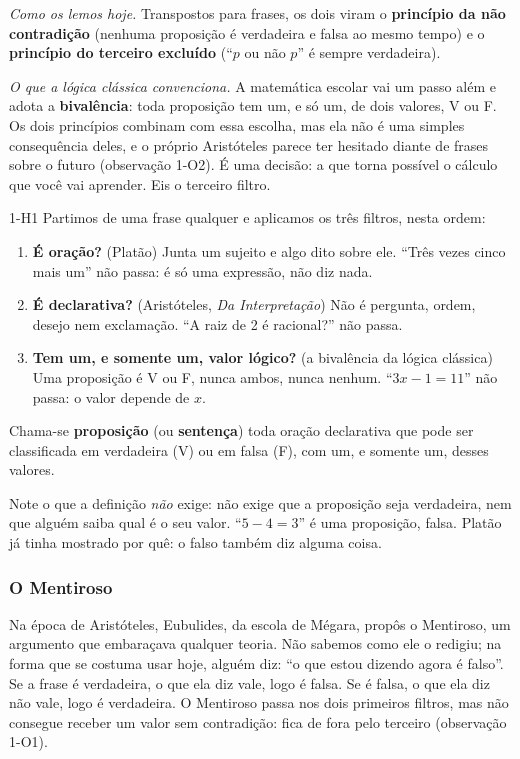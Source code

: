 \emph{Como os lemos hoje.} Transpostos para frases, os dois viram o \textbf{princípio da não contradição} (nenhuma proposição é verdadeira e falsa ao mesmo tempo) e o \textbf{princípio do terceiro excluído} (\enquote{$p$ ou não $p$} é sempre verdadeira).

\emph{O que a lógica clássica convenciona.} A matemática escolar vai um passo além e adota a \textbf{bivalência}: toda proposição tem um, e só um, de dois valores, V ou F. Os dois princípios combinam com essa escolha, mas ela não é uma simples consequência deles, e o próprio Aristóteles parece ter hesitado diante de frases sobre o futuro (observação 1-O2). É uma decisão: a que torna possível o cálculo que você vai aprender. Eis o terceiro filtro.

\begin{construcao}{1-H1}
Partimos de uma frase qualquer e aplicamos os três filtros, nesta ordem:
\begin{enumerate}[label=(\arabic*)]
  \item \textbf{É oração?} (Platão) Junta um sujeito e algo dito sobre ele. \enquote{Três vezes cinco mais um} não passa: é só uma expressão, não diz nada.
  \item \textbf{É declarativa?} (Aristóteles, \emph{Da Interpretação}) Não é pergunta, ordem, desejo nem exclamação. \enquote{A raiz de 2 é racional?} não passa.
  \item \textbf{Tem um, e somente um, valor lógico?} (a bivalência da lógica clássica) Uma proposição é V ou F, nunca ambos, nunca nenhum. \enquote{$3x-1=11$} não passa: o valor depende de $x$.
\end{enumerate}
\end{construcao}

\begin{definicao}[proposição]
Chama-se \textbf{proposição} (ou \textbf{sentença}) toda oração declarativa que pode ser classificada em verdadeira (V) ou em falsa (F), com um, e somente um, desses valores.
\end{definicao}

Note o que a definição \emph{não} exige: não exige que a proposição seja verdadeira, nem que alguém saiba qual é o seu valor. \enquote{$5-4=3$} é uma proposição, falsa. Platão já tinha mostrado por quê: o falso também diz alguma coisa.

\subsubsection{O Mentiroso}
Na época de Aristóteles, Eubulides, da escola de Mégara, propôs o Mentiroso, um argumento que embaraçava qualquer teoria. Não sabemos como ele o redigiu; na forma que se costuma usar hoje, alguém diz: \enquote{o que estou dizendo agora é falso}. Se a frase é verdadeira, o que ela diz vale, logo é falsa. Se é falsa, o que ela diz não vale, logo é verdadeira. O Mentiroso passa nos dois primeiros filtros, mas não consegue receber um valor sem contradição: fica de fora pelo terceiro (observação 1-O1).

